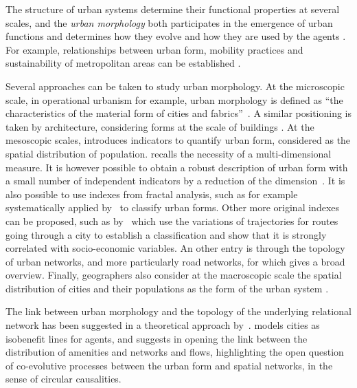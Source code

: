 \documentclass[11pt]{article}
\begin{document}
The structure of urban systems determine their functional properties at several scales, and the \emph{urban morphology} both participates in the emergence of urban functions and determines how they evolve and how they are used by the agents \citep{batty1994fractal}. For example, relationships between urban form, mobility practices and sustainability of metropolitan areas can be established \citep{le2010approche}.

Several approaches can be taken to study urban morphology. At the microscopic scale, in operational urbanism for example, urban morphology is defined as ``the characteristics of the material form of cities and fabrics''~\citep{paquot2010abc}. A similar positioning is taken by architecture, considering forms at the scale of buildings \citep{moudon1997urban}. At the mesoscopic scales, \cite{tsai2005quantifying} introduces indicators to quantify urban form, considered as the spatial distribution of population. \cite{le2009quantifier} recalls the necessity of a multi-dimensional measure. It is however possible to obtain a robust description of urban form with a small number of independent indicators by a reduction of the dimension~\citep{Schwarz201029}. It is also possible to use indexes from fractal analysis, such as for example systematically applied by~\cite{2016arXiv160808839C} to classify urban forms. Other more original indexes can be proposed, such as by~\cite{lee2017morphology} which use the variations of trajectories for routes going through a city to establish a classification and show that it is strongly correlated with socio-economic variables. An other entry is through the topology of urban networks, and more particularly road networks, for which \citep{2015arXiv151201268L} gives a broad overview. Finally, geographers also consider at the macroscopic scale the spatial distribution of cities and their populations as the form of the urban system \citep{pumain2011systems}.



The link between urban morphology and the topology of the underlying relational network has been suggested in a theoretical approach by~\cite{badariotti2007conception}. \cite{d2015mathematize} models cities as isobenefit lines for agents, and suggests in opening the link between the distribution of amenities and networks and flows, highlighting the open question of co-evolutive processes between the urban form and spatial networks, in the sense of circular causalities.
\end{document}
